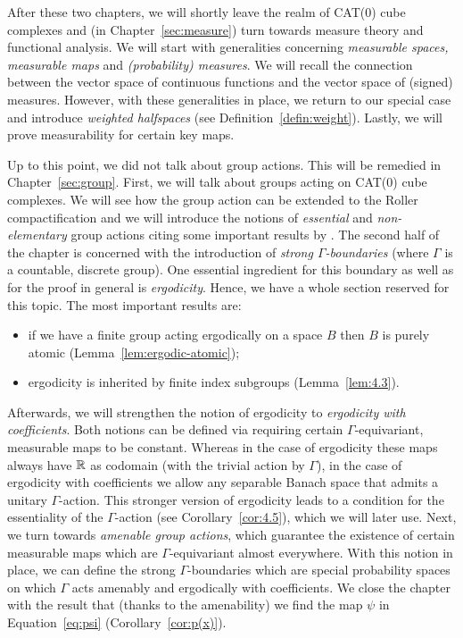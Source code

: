 After these two chapters, we will shortly leave the realm of CAT(0) cube complexes and (in Chapter~\ref{sec:measure}) turn towards measure theory and functional analysis. We will start with generalities concerning \emph{measurable spaces, measurable maps} and \emph{(probability) measures}. We will recall the connection between the vector space of continuous functions and the vector space of (signed) measures. However, with these generalities in place, we return to our special case and introduce \emph{weighted halfspaces} (see Definition~\ref{defin:weight}). Lastly, we will prove measurability for certain key maps. 

Up to this point, we did not talk about group actions. This will be remedied in Chapter~\ref{sec:group}. First, we will talk about groups acting on CAT(0) cube complexes. We will see how the group action can be extended to the Roller compactification and we will introduce the notions of \emph{essential} and \emph{non-elementary} group actions citing some important results by \textcite{Caprace2010}. The second half of the chapter is concerned with the introduction of \emph{strong \(\Gamma\)-boundaries} (where \(\Gamma\) is a countable, discrete group). One essential ingredient for this boundary as well as for the proof in general is \emph{ergodicity}. Hence, we have a whole section reserved for this topic. The most important results are:
\begin{itemize}
\item if we have a finite group acting ergodically on a space \(B\) then \(B\) is purely atomic (Lemma~\ref{lem:ergodic-atomic});
\item ergodicity is inherited by finite index subgroups (Lemma~\ref{lem:4.3}).
\end{itemize}
Afterwards, we will strengthen the notion of ergodicity to \emph{ergodicity with coefficients}. Both notions can be defined via requiring certain \(\Gamma\)-equivariant, measurable maps to be constant. Whereas in the case of ergodicity these maps always have \(\mathbb{R}\) as codomain (with the trivial action by \(\Gamma\)), in the case of ergodicity with coefficients we allow any separable Banach space that admits a unitary \(\Gamma\)-action. This stronger version of ergodicity leads to a condition for the essentiality of the \(\Gamma\)-action (see Corollary~\ref{cor:4.5}), which we will later use. Next, we turn towards \emph{amenable group actions}, which guarantee the existence of certain measurable maps which are \(\Gamma\)-equivariant almost everywhere. With this notion in place, we can define the strong \(\Gamma\)-boundaries which are special probability spaces on which \(\Gamma\) acts amenably and ergodically with coefficients. We close the chapter with the result that (thanks to the amenability) we find the map \(\psi\) in Equation~\eqref{eq:psi} (Corollary~\ref{cor:p(x)}).

